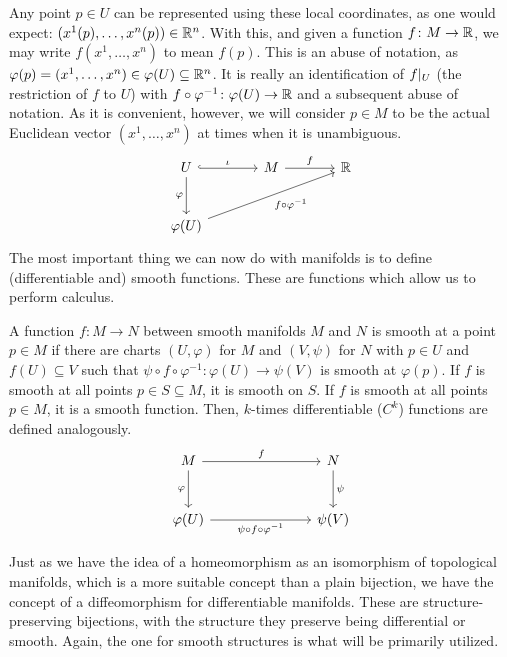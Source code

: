 \documentclass[a4paper,12pt]{article}
\begin{document}
Any point $p \in U$ can be represented using these local coordinates, as one would expect: $(x^1(p), \ldots, x^n(p)) \in \mathbb{R}^n$.
With this, and given a function $f \colon M \to \mathbb{R}$, we may write $f(x^1, \ldots, x^n)$ to mean $f(p)$.
This is an abuse of notation, as $\varphi(p) = (x^1, \ldots, x^n) \in \varphi(U) \subseteq \mathbb{R}^n$.
It is really an identification of $\eval*{f}{U}$ (the restriction of $f$ to $U$) with $f \circ \varphi^{-1} \colon \varphi(U) \to \mathbb{R}$ and a subsequent abuse of notation.
As it is convenient, however, we will consider $p \in M$ to be the actual Euclidean vector $(x^1, \ldots, x^n)$ at times when it is unambiguous.
\[\begin{tikzcd}[sep=large]
	U & M & \R \\
	{\varphi(U)}
	\arrow["\iota", hook, from=1-1, to=1-2]
	\arrow["\varphi"', from=1-1, to=2-1]
	\arrow["f", from=1-2, to=1-3]
	\arrow["f \circ \varphi^{-1}"', from=2-1, to=1-3]
\end{tikzcd}\]
The most important thing we can now do with manifolds is to define (differentiable and) smooth functions.
These are functions which allow us to perform calculus.
\begin{definition}\label{def:differentiable_and_smooth_function}
    A function $f \colon M \to N$ between smooth manifolds $M$ and $N$ is smooth at a point $p \in M$ if there are charts $(U, \varphi)$ for $M$ and $(V, \psi)$ for $N$ with $p \in U$ and $f(U) \subseteq V$ such that $\psi \circ f \circ \varphi^{-1} \colon \varphi(U) \to \psi(V)$ is smooth at $\varphi(p)$.
    If $f$ is smooth at all points $p \in S \subseteq M$, it is smooth on $S$.
    If $f$ is smooth at all points $p \in M$, it is a smooth function.
    Then, $k$-times differentiable ($C^k$) functions are defined analogously.
\[\begin{tikzcd}[sep=large]
	M && N \\
	{\varphi(U)} && {\psi(V})
	\arrow["f", from=1-1, to=1-3]
	\arrow["\varphi"', from=1-1, to=2-1]
	\arrow["\psi", from=1-3, to=2-3]
	\arrow["{\psi \circ f \circ \varphi^{-1}}"', from=2-1, to=2-3]
\end{tikzcd}\]
\end{definition}
Just as we have the idea of a homeomorphism as an isomorphism of topological manifolds, which is a more suitable concept than a plain bijection, we have the concept of a diffeomorphism for differentiable manifolds.
These are structure-preserving bijections, with the structure they preserve being differential or smooth.
Again, the one for smooth structures is what will be primarily utilized.
\end{document}
